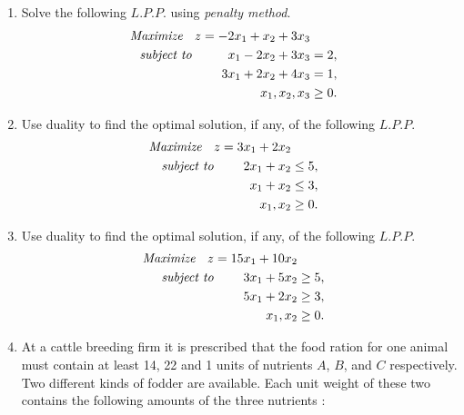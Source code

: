 \documentclass[11pt, a4paper]{article}
\begin{document}
\begin{enumerate}

\item Solve the following $L.P.P.$ using \textit{penalty method}.
	\begin{align*}
\textit{Maximize \hspace{6pt}} z = -2x_1 + x_2 + 3x_3 \\
\textit{subject to \hspace{25pt}} x_1 - 2x_2 + 3x_3 &= 2, \\
3x_1 + 2x_2 + 4x_3 &= 1, \\
x_1, x_2, x_3 &\geq 0.
	\end{align*}
	
	
	

\item Use duality to find the optimal solution, if any, of the following $L.P.P.$
	\begin{align*}
\textit{Maximize \hspace{6pt}} z = 3x_1 + 2x_2 \\
\textit{subject to \hspace{20pt}} 2x_1 + x_2 &\leq 5, \\
x_1 + x_2 &\leq 3, \\
x_1, x_2 &\geq 0.
	\end{align*}
	
	



\item Use duality to find the optimal solution, if any, of the following $L.P.P.$
	\begin{align*}
\textit{Maximize \hspace{6pt}} z = 15x_1 + 10x_2 \\
\textit{subject to \hspace{20pt}} 3x_1 + 5x_2 &\geq 5, \\
5x_1 + 2x_2 &\geq 3, \\
x_1, x_2 &\geq 0.
	\end{align*}
	
	
\newpage




\item At a cattle breeding firm it is prescribed that the food ration for one animal must contain at least 14, 22 and 1 units of nutrients $A$, $B$, and $C$ respectively. Two different kinds of fodder are available. Each unit weight of these two contains the following amounts of the three nutrients :


\end{enumerate}
\end{document}
